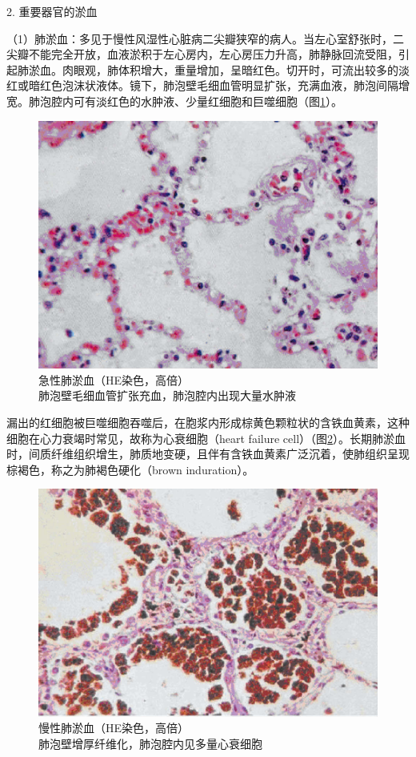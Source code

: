 {2. 重要器官的淤血}

（1）肺淤血：多见于慢性风湿性心脏病二尖瓣狭窄的病人。当左心室舒张时，二尖瓣不能完全开放，血液淤积于左心房内，左心房压力升高，肺静脉回流受阻，引起肺淤血。肉眼观，肺体积增大，重量增加，呈暗红色。切开时，可流出较多的淡红或暗红色泡沫状液体。镜下，肺泡壁毛细血管明显扩张，充满血液，肺泡间隔增宽。肺泡腔内可有淡红色的水肿液、少量红细胞和巨噬细胞（图\ref{fig3-1}）。
\begin{figure}[!htbp]
\centering
\includegraphics{./images/Image00034.jpg}
\caption{急性肺淤血（HE染色，高倍）\\ {\small 肺泡壁毛细血管扩张充血，肺泡腔内出现大量水肿液}}
\label{fig3-1} 
\end{figure} 


漏出的红细胞被巨噬细胞吞噬后，在胞浆内形成棕黄色颗粒状的含铁血黄素，这种细胞在心力衰竭时常见，故称为心衰细胞（heart
failure
cell）（图\ref{fig3-2}）。长期肺淤血时，间质纤维组织增生，肺质地变硬，且伴有含铁血黄素广泛沉着，使肺组织呈现棕褐色，称之为肺褐色硬化（brown
induration）。

\begin{figure}[!htbp]
\centering
\includegraphics{./images/Image00035.jpg}
\caption{慢性肺淤血（HE染色，高倍）\\ {\small 肺泡壁增厚纤维化，肺泡腔内见多量心衰细胞}}
\label{fig3-2} 
\end{figure} 

